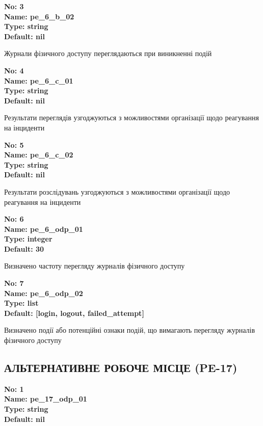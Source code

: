 \documentclass{article}
\begin{document}
{\footnotesize\bfseries
No: 3\\
Name: pe\_\allowbreak{}6\_\allowbreak{}b\_\allowbreak{}02\\
Type: string\\
Default: nil
}

{\footnotesize Журнали фізичного доступу переглядаються при виникненні подій}


{\footnotesize\bfseries
No: 4\\
Name: pe\_\allowbreak{}6\_\allowbreak{}c\_\allowbreak{}01\\
Type: string\\
Default: nil
}

{\footnotesize Результати переглядів узгоджуються з можливостями організації щодо реагування на інциденти}


{\footnotesize\bfseries
No: 5\\
Name: pe\_\allowbreak{}6\_\allowbreak{}c\_\allowbreak{}02\\
Type: string\\
Default: nil
}

{\footnotesize Результати розслідувань узгоджуються з можливостями організації щодо реагування на інциденти}


{\footnotesize\bfseries
No: 6\\
Name: pe\_\allowbreak{}6\_\allowbreak{}odp\_\allowbreak{}01\\
Type: integer\\
Default: 30
}

{\footnotesize Визначено частоту перегляду журналів фізичного доступу}


{\footnotesize\bfseries
No: 7\\
Name: pe\_\allowbreak{}6\_\allowbreak{}odp\_\allowbreak{}02\\
Type: list\\
Default: [\textquotedbl{}login\textquotedbl{}, \textquotedbl{}logout\textquotedbl{}, \textquotedbl{}failed\_\allowbreak{}attempt\textquotedbl{}]
}

{\footnotesize Визначено події або потенційні ознаки подій, що вимагають перегляду журналів фізичного доступу}




\subsection{АЛЬТЕРНАТИВНЕ РОБОЧЕ МІСЦЕ (PE-17)}


\vspace{10pt}
{\footnotesize\bfseries
No: 1\\
Name: pe\_\allowbreak{}17\_\allowbreak{}odp\_\allowbreak{}01\\
Type: string\\
Default: nil
}
\end{document}
